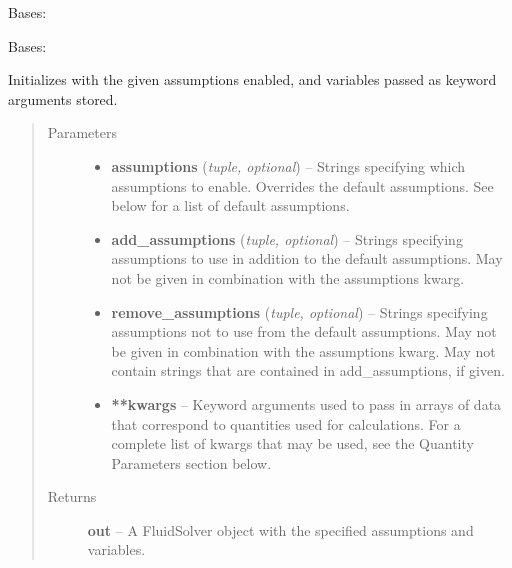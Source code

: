 \documentclass[letterpaper,10pt,english]{sphinxmanual}
\begin{document}

\begin{fulllineitems}
\label{atmos:atmos.solve.ExcludeError}
Bases: 

\end{fulllineitems}


\begin{fulllineitems}
\label{atmos:atmos.solve.FluidSolver}
Bases: {\hyperref[atmos:atmos.solve.BaseSolver]{}}

Initializes with the given assumptions enabled, and variables passed as
keyword arguments stored.
\begin{quote}\begin{description}
\item[{Parameters}] \leavevmode\begin{itemize}
\item {} 
\textbf{assumptions} (\emph{tuple, optional}) -- Strings specifying which assumptions to enable. Overrides the default
assumptions. See below for a list of default assumptions.

\item {} 
\textbf{add\_assumptions} (\emph{tuple, optional}) -- Strings specifying assumptions to use in addition to the default
assumptions. May not be given in combination with the assumptions kwarg.

\item {} 
\textbf{remove\_assumptions} (\emph{tuple, optional}) -- Strings specifying assumptions not to use from the default assumptions.
May not be given in combination with the assumptions kwarg. May not
contain strings that are contained in add\_assumptions, if given.

\item {} 
\textbf{**kwargs} -- 
Keyword arguments used to pass in arrays of data that correspond to
quantities used for calculations. For a complete list of kwargs that
may be used, see the Quantity Parameters section below.


\end{itemize}

\item[{Returns}] \leavevmode
\textbf{out} --
A FluidSolver object with the specified assumptions and variables.


\end{description}
\end{quote}
\end{fulllineitems}
\end{document}

